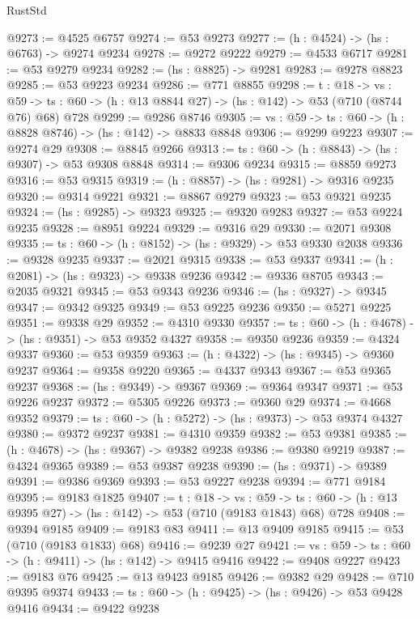 \begin{lexlean}{RustStd}
\begin{coremodule}
@9273 := @4525 @6757
@9274 := @53 @9273
@9277 := (h : @4524) -> (hs : @6763) -> @9274 @9234
@9278 := @9272 @9222
@9279 := @4533 @6717
@9281 := @53 @9279 @9234
@9282 := (hs : @8825) -> @9281
@9283 := @9278 @8823
@9285 := @53 @9223 @9234
@9286 := @771 @8855
@9298 := {t : @18} ->
  {vs : @59} -> {ts : @60} -> (h : @13 @8844 @27) -> (hs : @142) -> @53 (@710 (@8744 @76) @68) @728
@9299 := @9286 @8746
@9305 := {vs : @59} -> {ts : @60} -> (h : @8828 @8746) -> (hs : @142) -> @8833 @8848
@9306 := @9299 @9223
@9307 := @9274 @29
@9308 := @8845 @9266
@9313 := {ts : @60} -> (h : @8843) -> (hs : @9307) -> @53 @9308 @8848
@9314 := @9306 @9234
@9315 := @8859 @9273
@9316 := @53 @9315
@9319 := (h : @8857) -> (hs : @9281) -> @9316 @9235
@9320 := @9314 @9221
@9321 := @8867 @9279
@9323 := @53 @9321 @9235
@9324 := (hs : @9285) -> @9323
@9325 := @9320 @9283
@9327 := @53 @9224 @9235
@9328 := @8951 @9224
@9329 := @9316 @29
@9330 := @2071 @9308
@9335 := {ts : @60} -> (h : @8152) -> (hs : @9329) -> @53 @9330 @2038
@9336 := @9328 @9235
@9337 := @2021 @9315
@9338 := @53 @9337
@9341 := (h : @2081) -> (hs : @9323) -> @9338 @9236
@9342 := @9336 @8705
@9343 := @2035 @9321
@9345 := @53 @9343 @9236
@9346 := (hs : @9327) -> @9345
@9347 := @9342 @9325
@9349 := @53 @9225 @9236
@9350 := @5271 @9225
@9351 := @9338 @29
@9352 := @4310 @9330
@9357 := {ts : @60} -> (h : @4678) -> (hs : @9351) -> @53 @9352 @4327
@9358 := @9350 @9236
@9359 := @4324 @9337
@9360 := @53 @9359
@9363 := (h : @4322) -> (hs : @9345) -> @9360 @9237
@9364 := @9358 @9220
@9365 := @4337 @9343
@9367 := @53 @9365 @9237
@9368 := (hs : @9349) -> @9367
@9369 := @9364 @9347
@9371 := @53 @9226 @9237
@9372 := @5305 @9226
@9373 := @9360 @29
@9374 := @4668 @9352
@9379 := {ts : @60} -> (h : @5272) -> (hs : @9373) -> @53 @9374 @4327
@9380 := @9372 @9237
@9381 := @4310 @9359
@9382 := @53 @9381
@9385 := (h : @4678) -> (hs : @9367) -> @9382 @9238
@9386 := @9380 @9219
@9387 := @4324 @9365
@9389 := @53 @9387 @9238
@9390 := (hs : @9371) -> @9389
@9391 := @9386 @9369
@9393 := @53 @9227 @9238
@9394 := @771 @9184
@9395 := @9183 @1825
@9407 := {t : @18} ->
  {vs : @59} ->
  {ts : @60} -> (h : @13 @9395 @27) -> (hs : @142) -> @53 (@710 (@9183 @1843) @68) @728
@9408 := @9394 @9185
@9409 := @9183 @83
@9411 := @13 @9409 @9185
@9415 := @53 (@710 (@9183 @1833) @68)
@9416 := @9239 @27
@9421 := {vs : @59} -> {ts : @60} -> (h : @9411) -> (hs : @142) -> @9415 @9416
@9422 := @9408 @9227
@9423 := @9183 @76
@9425 := @13 @9423 @9185
@9426 := @9382 @29
@9428 := @710 @9395 @9374
@9433 := {ts : @60} -> (h : @9425) -> (hs : @9426) -> @53 @9428 @9416
@9434 := @9422 @9238

\end{coremodule}
\end{lexlean}
